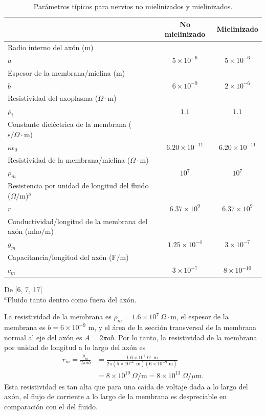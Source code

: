 \documentclass[12pt]{book}
\begin{document}
\begin{table}[htbp]
\centering
\caption{Parámetros típicos para nervios no mielinizados y mielinizados.}
\label{tab:12.5}
\begin{tabularx}{\textwidth}{X c c}
\toprule
 & No mielinizado & Mielinizado \\
\midrule
Radio interno del axón ($\text{m}$) & & \\
\quad $a$ & $5 \times 10^{-6}$ & $5 \times 10^{-6}$ \\
Espesor de la membrana/mielina ($\text{m}$) & & \\
\quad $b$ & $6 \times 10^{-9}$ & $2 \times 10^{-6}$ \\
Resistividad del axoplasma ($\Omega\cdot\text{m}$) & & \\
\quad $\rho_i$ & $1.1$ & $1.1$ \\
Constante dieléctrica de la membrana ($\text{s/}\Omega\cdot\text{m}$) & & \\
\quad $\kappa\epsilon_0$ & $6.20 \times 10^{-11}$ & $6.20 \times 10^{-11}$ \\
Resistividad de la membrana/mielina ($\Omega\cdot\text{m}$) & & \\
\quad $\rho_m$ & $10^7$ & $10^7$ \\
Resistencia por unidad de longitud del fluido ($\Omega/\text{m}$)$^a$ & & \\
\quad $r$ & $6.37 \times 10^9$ & $6.37 \times 10^9$ \\
Conductividad/longitud de la membrana del axón ($\text{mho/m}$) & & \\
\quad $g_m$ & $1.25 \times 10^{-4}$ & $3 \times 10^{-7}$ \\
Capacitancia/longitud del axón ($\text{F/m}$) & & \\
\quad $c_m$ & $3 \times 10^{-7}$ & $8 \times 10^{-10}$ \\
\bottomrule
\end{tabularx}
\addvspace{5pt}
{\raggedright\small De [6, 7, 17] \\
$^a$Fluido tanto dentro como fuera del axón. \par}
\end{table}

La resistividad de la membrana es $\rho_m = 1.6 \times 10^7\ \Omega\cdot\text{m}$, el espesor de la membrana es $b = 6 \times 10^{-9}\text{ m}$, y el área de la sección transversal de la membrana normal al eje del axón es $A = 2\pi a b$. Por lo tanto, la resistividad de la membrana por unidad de longitud a lo largo del axón es
\begin{align}
r_m = \frac{\rho_m}{2\pi a b} &= \frac{1.6 \times 10^7\ \Omega\cdot\text{m}}{2\pi(5 \times 10^{-6}\text{ m})(6 \times 10^{-9}\text{ m})} \label{eq:12.48} \\
&= 8 \times 10^{19}\ \Omega/\text{m} = 8 \times 10^{13}\ \Omega/\mu\text{m}. \label{eq:12.49}
\end{align}
Esta resistividad es tan alta que para una caída de voltaje dada a lo largo del axón, el flujo de corriente a lo largo de la membrana es despreciable en comparación con el del fluido.
\end{document}
